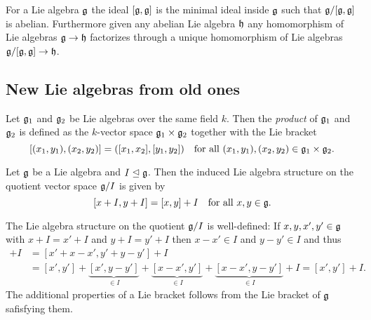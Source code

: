 \begin{rem}
 For a Lie algebra $\mathfrak{g}$ the ideal $[\mathfrak{g},\mathfrak{g}]$ is the minimal ideal inside $\mathfrak{g}$ such that $\mathfrak{g}/[\mathfrak{g},\mathfrak{g}]$ is abelian. Furthermore given any abelian Lie algebra $\mathfrak{h}$ any homomorphism of Lie algebras $\mathfrak{g} \to \mathfrak{h}$ factorizes through a unique homomorphism of Lie algebras $\mathfrak{g}/[\mathfrak{g},\mathfrak{g}] \to \mathfrak{h}$.
 \begin{center}
 \end{center}
\end{rem}




\subsection{New Lie algebras from old ones}


\begin{defi}
 Let $\mathfrak{g}_1$ and $\mathfrak{g}_2$ be Lie algebras over the same field $k$. Then the \emph{product} of $\mathfrak{g}_1$ and $\mathfrak{g}_2$ is defined as the $k$-vector space $\mathfrak{g}_1 \times \mathfrak{g}_2$ together with the Lie bracket
 \[
  [(x_1, y_1), (x_2, y_2)]
  = ([x_1, x_2], [y_1, y_2])
  \quad
  \text{for all $(x_1, y_1), (x_2, y_2) \in \mathfrak{g}_1 \times \mathfrak{g}_2$}.
 \]
\end{defi}


\begin{defi}
 Let $\mathfrak{g}$ be a Lie algebra and $I \trianglelefteq \mathfrak{g}$. Then the induced Lie algebra structure on the quotient vector space $\mathfrak{g}/I$ is given by
 \[
  [x+I, y+I] = [x,y] + I \quad \text{for all $x,y \in \mathfrak{g}$}.
 \]
\end{defi}


\begin{rem}
 The Lie algebra structure on the quotient $\mathfrak{g}/I$ is well-defined: If $x,y, x',y' \in \mathfrak{g}$ with $x+I = x'+I$ and $y+I = y'+I$ then $x-x' \in I$ and $y-y' \in I$ and thus
 \begin{align*}
  [x,y] + I
  &= [x' + x-x', y' + y-y'] + I \\
  &= [x',y'] + \underbrace{[x', y-y']}_{\in I} + \underbrace{[x-x', y']}_{\in I} + \underbrace{[x-x', y-y']}_{\in I} + I
  = [x', y'] + I.
 \end{align*}
 The additional properties of a Lie bracket follows from the Lie bracket of $\mathfrak{g}$ safisfying them.
\end{rem}


